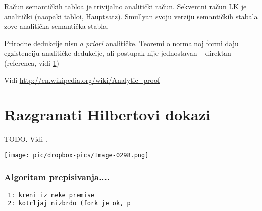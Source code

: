 Račun semantičkih tabloa je trivijalno analitički račun. Sekventni račun LK je analitički (naopaki tabloi, Hauptsatz).
Smullyan svoju verziju semantičkih stabala zove analitička semantička stabla.

Prirodne dedukcije nisu   \textit{a priori} analitičke. Teoremi o normalnoj formi daju
egzistenciju analitičke dedukcije, ali postupak nije jednostavan -- direktan (referenca, vidi \ref{})






Vidi\newline
{\smaller
\url{http://en.wikipedia.org/wiki/Analytic_proof}
}






\newpage
\section{Razgranati Hilbertovi dokazi}
\begin{defn}
 TODO. Vidi \cite{sika-disertacija}.
\end{defn}

\begin{pr}\strut\newline 
\begin{center}
 \texttt{[image: pic/dropbox-pics/Image-0298.png]}
\end{center}
\end{pr}


\subsubsection*{Algoritam prepisivanja....}
\begin{verbatim}
 1: kreni iz neke premise
 2: kotrljaj nizbrdo (fork je ok, p
\end{verbatim}


